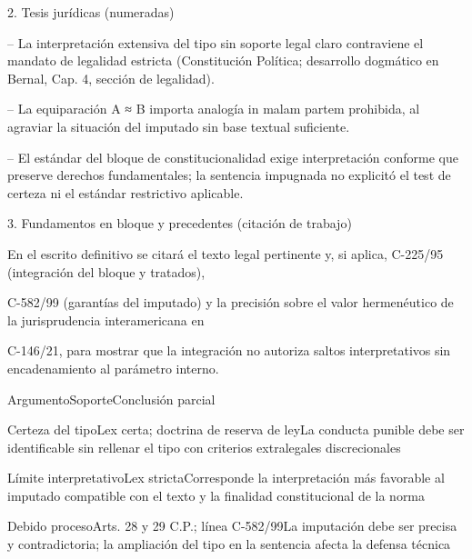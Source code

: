 \documentclass[11pt,a4paper]{article}
\begin{document}
      2. Tesis jurídicas (numeradas)\par



-- La interpretación extensiva del tipo sin soporte legal claro contraviene el mandato de legalidad estricta (Constitución Política; desarrollo dogmático en Bernal, Cap. 4, sección de legalidad).\par


-- La equiparación A ≈ B importa analogía in malam partem prohibida, al agraviar la situación del imputado sin base textual suficiente.\par


-- El estándar del bloque de constitucionalidad exige interpretación conforme que preserve derechos fundamentales; la sentencia impugnada no explicitó el test de certeza ni el estándar restrictivo aplicable.\par





      3. Fundamentos en bloque y precedentes (citación de trabajo)\par


        En el escrito definitivo se citará el texto legal pertinente y, si aplica, C-225/95 (integración del bloque y tratados),\par
        C-582/99 (garantías del imputado) y la precisión sobre el valor hermenéutico de la jurisprudencia interamericana en\par
        C-146/21, para mostrar que la integración no autoriza saltos interpretativos sin encadenamiento al parámetro interno.\par




          ArgumentoSoporteConclusión parcial\par




          Certeza del tipoLex certa; doctrina de reserva de leyLa conducta punible debe ser identificable sin rellenar el tipo con criterios extralegales discrecionales\par

          Límite interpretativoLex strictaCorresponde la interpretación más favorable al imputado compatible con el texto y la finalidad constitucional de la norma\par

          Debido procesoArts. 28 y 29 C.P.; línea C-582/99La imputación debe ser precisa y contradictoria; la ampliación del tipo en la sentencia afecta la defensa técnica\par
\end{document}
